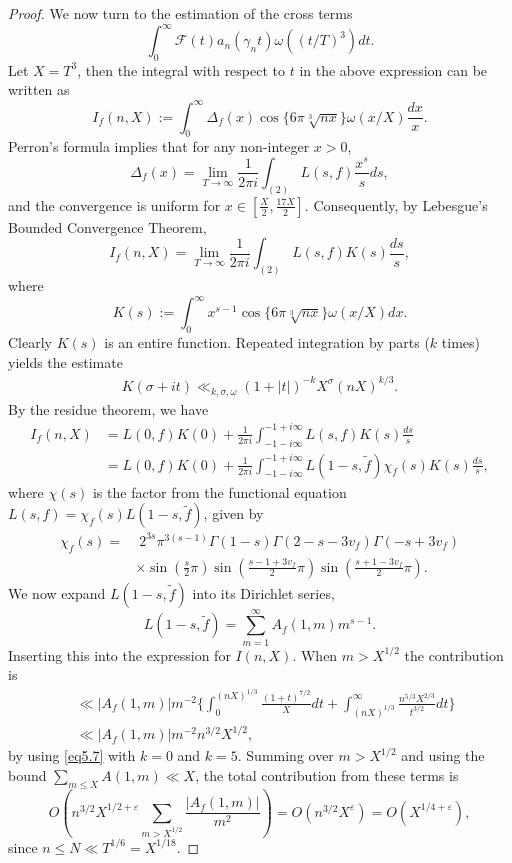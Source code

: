 \documentclass[10pt,leqno]{amsart}
\numberwithin{equation}{section}
\begin{document}
\begin{proof}
We now turn to the estimation of the cross terms
\[
\int_0^{\infty} \mathcal{F}(t) a_n(\gamma_n t)   \omega \left((t/T)^3\right) dt.
\]
Let $X=T^3$, then the integral with respect to $t$ in the above expression can be written as
\[
I_f(n, X) := \int_0^{\infty} \Delta_f(x) \cos\{6\pi \sqrt[3]{n x}\} \omega(x / X)  \frac{dx}{x}.
\]
Perron's formula implies that for any non-integer $x >0$, 
\begin{equation*}
    \Delta_f(x)=\lim_{T \to \infty}\frac{1}{2\pi i} \int_{(2)}L(s, f)\frac{x^s}{s} ds,
\end{equation*}
and the convergence is uniform for $x \in [\frac{X}{2}, \frac{17X}{2}]$. Consequently, by Lebesgue's Bounded Convergence Theorem,
\begin{equation}\label{eq5.6}
I_f(n, X) = \lim_{T \to \infty} \frac{1}{2\pi i} \int_{(2)} L(s, f)   K(s)   \frac{ds}{s},
\end{equation}
where
\[
K(s) := \int_0^{\infty} x^{s-1} \cos\{6\pi \sqrt[3]{n x}\}   \omega(x / X)   dx.
\]
Clearly $K(s)$ is an entire function. Repeated integration by parts ($k$ times) yields the estimate
\begin{equation}\label{eq5.7}
\begin{aligned}
K(\sigma + it)
\ll_{k,\sigma,\omega} (1+|t|)^{-k} X^\sigma (n X)^{k/3}.
\end{aligned}
\end{equation}
By the residue theorem, we have
\[
\begin{aligned}
I_f(n, X) &= L(0, f) K(0) + \frac{1}{2\pi i} \int_{-1-i\infty}^{-1+i\infty} L(s, f) K(s) \frac{ds}{s} \\
&= L(0, f) K(0) + \frac{1}{2\pi i} \int_{-1-i\infty}^{-1+i\infty} L(1-s, \tilde{f}) \chi_f(s) K(s) \frac{ds}{s},
\end{aligned}
\]
where $\chi(s)$ is the factor from the functional equation $L(s, f) = \chi_f(s) L(1-s, \tilde{f})$, given by
\[
\begin{aligned}
\chi_f(s) = & \; 2^{3s} \pi^{3(s-1)}   \Gamma(1-s)   \Gamma(2-s-3v_f)   \Gamma(-s+3v_f) \\
          & \times \sin \left(\frac{s}{2}\pi\right) \sin \left(\frac{s-1+3v_f}{2}\pi\right) \sin \left(\frac{s+1-3v_f}{2}\pi\right).
\end{aligned}
\]
We now expand $L(1-s,\tilde{f})$ into its Dirichlet series,
\[
L(1-s, \tilde{f}) = \sum_{m=1}^\infty A_f(1, m)   m^{ s-1}.
\]
Inserting this into the expression for $I(n,X)$. When $m> X^{1/2}$ the contribution is  
\[
\begin{aligned}
&\ll \left|A_f(1,m)\right| m^{-2} \Bigg\{ \int_0^{(nX)^{1/3}}
\frac{(1+t)^{7/2}} {X} dt + \int_{(nX)^{1/3}}^\infty \frac{n^{5/3} X^{2/3}}{t^{3/2}} dt \Bigg\} \\
&\ll \left|A_f(1,m)\right| m^{-2}   n^{3/2} X^{1/2},
\end{aligned}
\]
by using \eqref{eq5.7} with $k=0$ and $k=5$.
Summing over $m > X^{1/2}$ and using the bound $\sum_{m\leqslant X}A(1,m) \ll X$, the total contribution from these terms is 
\[
O \left( n^{3/2} X^{1/2+\varepsilon} \sum_{m > X^{1/2}} \frac{\left|A_f(1,m)\right|}{m^2} \right) = O \left( n^{3/2} X^{\varepsilon} \right) = O \left( X^{1/4+\varepsilon} \right),
\]
since $n \le N \ll T^{1/6} = X^{1/18}$.


\end{proof}
\end{document}
